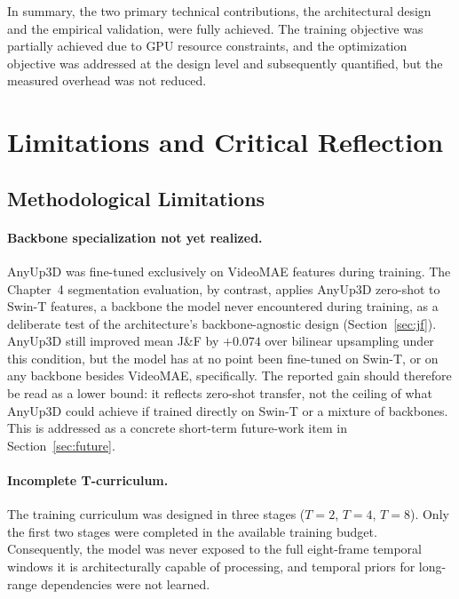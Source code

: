In summary, the two primary technical contributions, the architectural design and the empirical validation, were fully achieved.
The training objective was partially achieved due to GPU resource constraints, and the optimization objective was addressed at the design level and subsequently quantified, but the measured overhead was not reduced.

\section{Limitations and Critical Reflection}
\label{sec:limitations}

\subsection{Methodological Limitations}

\paragraph{Backbone specialization not yet realized.}
AnyUp3D was fine-tuned exclusively on VideoMAE features during training.
The Chapter~4 segmentation evaluation, by contrast, applies AnyUp3D zero-shot to Swin-T features, a backbone the model never encountered during training, as a deliberate test of the architecture's backbone-agnostic design (Section~\ref{sec:jf}).
AnyUp3D still improved mean J\&F by $+0.074$ over bilinear upsampling under this condition, but the model has at no point been fine-tuned on Swin-T, or on any backbone besides VideoMAE, specifically.
The reported gain should therefore be read as a lower bound: it reflects zero-shot transfer, not the ceiling of what AnyUp3D could achieve if trained directly on Swin-T or a mixture of backbones.
This is addressed as a concrete short-term future-work item in Section~\ref{sec:future}.


\paragraph{Incomplete T-curriculum.}
The training curriculum was designed in three stages ($T\!=\!2$, $T\!=\!4$, $T\!=\!8$).
Only the first two stages were completed in the available training budget.
Consequently, the model was never exposed to the full eight-frame temporal windows it is architecturally capable of processing, and temporal priors for long-range dependencies were not learned.

